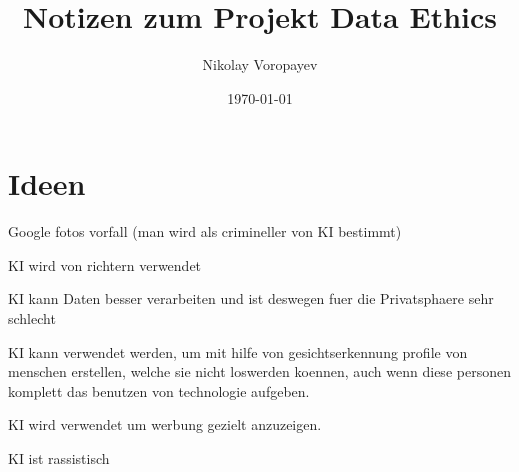 \documentclass{article}
\title{Notizen zum Projekt Data Ethics}
\author{Nikolay Voropayev}
\date{\today}
\begin{document}
\maketitle


\tableofcontents

\section{Ideen}
Google fotos vorfall (man wird als crimineller von KI bestimmt)

KI wird von richtern verwendet

KI kann Daten besser verarbeiten und ist deswegen fuer die Privatsphaere sehr schlecht

KI kann verwendet werden, um mit hilfe von gesichtserkennung profile von menschen erstellen, welche sie nicht loswerden koennen, auch wenn diese personen komplett das benutzen von technologie aufgeben.

KI wird verwendet um werbung gezielt anzuzeigen.

KI ist rassistisch


\printbibliography
\end{document}
